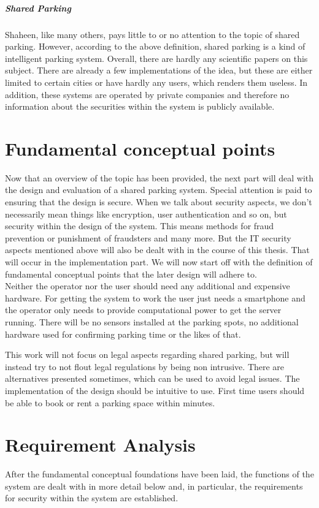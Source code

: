 \documentclass[
a4paper,     %
titlepage,   %
14pt         %
]{scrartcl}  %
\theoremstyle{mystyle}
\begin{document}
\subparagraph{Shared Parking}
Shaheen, like many others, pays little to or no attention to the topic of shared parking. However, according to the above definition, shared parking is a kind of intelligent parking system. Overall, there are hardly any scientific papers on this subject. There are already a few implementations of the idea, but these are either limited to certain cities or have hardly any users, which renders them useless. In addition, these systems are operated by private companies and therefore no information about the securities within the system is publicly available.

\section{Fundamental conceptual points}
Now that an overview of the topic has been provided, the next part will deal with the design and evaluation of a shared parking system. Special attention is paid to ensuring that the design is secure. When we talk about security aspects, we don't necessarily mean things like encryption, user authentication and so on, but security within the design of the system. This means methods for fraud prevention or punishment of fraudsters and many more. But the IT security aspects mentioned above will also be dealt with in the course of this thesis. That will occur in the implementation part. We will now start off with the definition of fundamental conceptual points that the later design will adhere to.\\

Neither the operator nor the user should need any additional and expensive hardware. For getting the system to work the user just needs a smartphone and the operator only needs to provide computational power to get the server running. There will be no sensors installed at the parking spots, no additional hardware used for confirming parking time or the likes of that.

This work will not focus on legal aspects regarding shared parking, but will instead try to not flout legal regulations by being non intrusive. There are alternatives presented sometimes, which can be used to avoid legal issues.
The implementation of the design should be intuitive to use. First time users should be able to book or rent a parking space within minutes.

\section{Requirement Analysis}
After the fundamental conceptual foundations have been laid, the functions of the system are dealt with in more detail below and, in particular, the requirements for security within the system are established.
\end{document}
